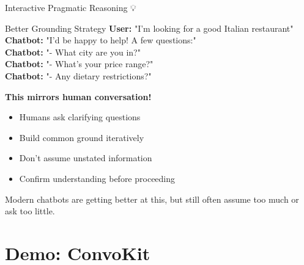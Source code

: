 \documentclass[aspectratio=169]{beamer}
\begin{document}
\begin{frame}[fragile]{Interactive Pragmatic Reasoning 💡}
\small
    \begin{block}{Better Grounding Strategy}
        \textbf{User:} "I'm looking for a good Italian restaurant" \\
        \textbf{Chatbot:} "I'd be happy to help! A few questions:" \\
        \textbf{Chatbot:} "- What city are you in?" \\
        \textbf{Chatbot:} "- What's your price range?" \\
        \textbf{Chatbot:} "- Any dietary restrictions?"
    \end{block}

    \vspace{0.3cm}

    \textbf{This mirrors human conversation!}

    \begin{itemize}\setlength{\itemsep}{0pt}
        \item Humans ask clarifying questions
        \item Build common ground iteratively
        \item Don't assume unstated information
        \item Confirm understanding before proceeding
    \end{itemize}

    \vspace{0.3cm}

    \begin{thinkaboutit}
        Modern chatbots are getting better at this, but still often assume too much or ask too little.
    \end{thinkaboutit}
\end{frame}

\section{Demo: ConvoKit}
\end{document}
